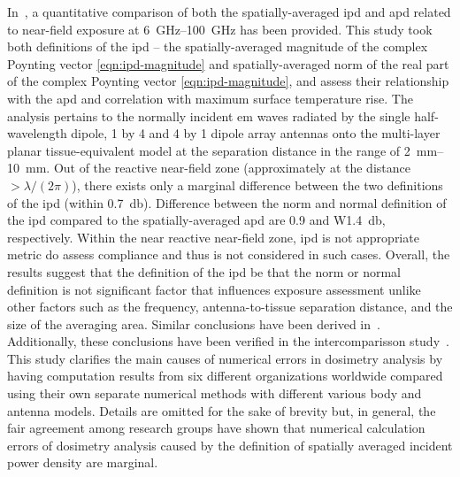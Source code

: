 In~\cite{Li2021Quantitative}, a quantitative comparison of both the spatially-averaged \gls{ipd} and \gls{apd} related to near-field exposure at \SIrange[range-units=single,range-phrase=--]{6}{100}{\GHz} has been provided.
This study took both definitions of the \gls{ipd} -- the spatially-averaged magnitude of the complex Poynting vector \cref{eqn:ipd-magnitude} and spatially-averaged norm of the real part of the complex Poynting vector \cref{eqn:ipd-magnitude}, and assess their relationship with the \gls{apd} and correlation with maximum surface temperature rise.
The analysis pertains to the normally incident \gls{em} waves radiated by the single half-wavelength dipole, 1 by 4 and 4 by 1 dipole array antennas onto the multi-layer planar tissue-equivalent model at the separation distance in the range of \SIrange[range-units=single,range-phrase=--]{2}{10}{\mm}.
Out of the reactive near-field zone (approximately at the distance $> \lambda / (2 \pi)$), there exists only a marginal difference between the two definitions of the \gls{ipd} (within \SI{0.7}{\decibel}).
Difference between the norm and normal definition of the \gls{ipd} compared to the spatially-averaged \gls{apd} are \SI{0.9}{} and W\SI{1.4}{\decibel}, respectively.
Within the near reactive near-field zone, \gls{ipd} is not appropriate metric do assess compliance and thus is not considered in such cases.
Overall, the results suggest that the definition of the \gls{ipd} be that the norm or normal definition is not significant factor that influences exposure assessment unlike other factors such as the frequency, antenna-to-tissue separation distance, and the size of the averaging area.
Similar conclusions have been derived in~\cite{DeSantis2022On}.
Additionally, these conclusions have been verified in the intercomparisson study~\cite{Li2021Intercomparison}.
This study clarifies the main causes of numerical errors in dosimetry analysis by having computation results from six different organizations worldwide compared using their own separate numerical methods with different various body and antenna models.
Details are omitted for the sake of brevity but, in  general, the fair agreement among research groups have shown that numerical calculation errors of dosimetry analysis caused by the definition of spatially averaged incident power density are marginal.

